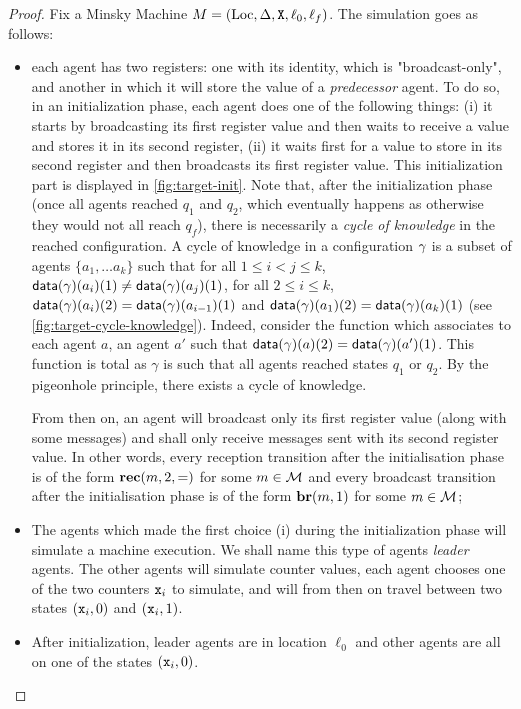 \begin{proof}
	Fix a Minsky Machine $M= (\text{Loc}, \Delta, \mathtt{X}, \ell_0, \ell_f)$. The simulation goes as follows: 
	\begin{itemize}
		\item each agent has two registers: one with its identity, which is "broadcast-only", and another in which it will store the value of a \emph{predecessor} agent. To do so, in an initialization phase, each agent does one of the following things: (i) it starts by broadcasting its first register value and then waits to receive a value and stores it in its second register, (ii) it waits first for a value to store in its second register and then broadcasts its first register value. This initialization part is displayed in \cref{fig:target-init}. Note that, after the initialization phase (once all agents reached $q_1$ and $q_2$, which eventually happens as otherwise they would not all reach $q_f$), there is necessarily a \emph{cycle of knowledge} in the reached configuration. A cycle of knowledge in a configuration $\gamma$ is a subset of agents $\{a_1, \dots a_k\}$ such that for all $1 \leq i < j \leq k$, $\mathsf{data}(\gamma)(a_i)(1) \ne \mathsf{data}(\gamma)(a_j)(1)$, for all $2 \leq i \leq k$, $\mathsf{data}(\gamma)(a_i)(2) = \mathsf{data}(\gamma)(a_{i-1})(1)$ and $\mathsf{data}(\gamma)(a_1)(2) = \mathsf{data}(\gamma)(a_{k})(1)$ (see \cref{fig:target-cycle-knowledge}). Indeed, consider the function which associates to each agent $a$, an agent $a'$ such that $\mathsf{data}(\gamma)(a)(2) = \mathsf{data}(\gamma)(a')(1)$. This function is total as $\gamma$ is such that all agents reached states $q_1$ or $q_2$. By the pigeonhole principle, there exists a cycle of knowledge.
		
		From then on, an agent will broadcast only its first register value (along with some messages) and shall only receive messages sent with its second register value. In other words, every reception transition after the initialisation phase is of the form $\textbf{rec}(m, 2, =)$ for some $m \in \mathcal{M}$ and every broadcast transition after the initialisation  phase is of the form $\textbf{br}(m, 1)$ for some $m \in \mathcal{M}$;
		
		\item The agents which made the first choice (i) during the initialization phase will simulate a machine execution. We shall name this type of agents \emph{leader} agents.  
		The other agents will simulate counter values, each agent chooses one of the two counters $\mathtt{x}_i$ to simulate, and will from then on travel between two states $(\mathtt{x}_i, 0)$ and $(\mathtt{x}_i, 1)$.
		
		\item After initialization, leader agents are in location $\ell_0$ and other agents are all on one of the states $(\mathtt{x}_i, 0)$.
		

\end{itemize}
\end{proof}
